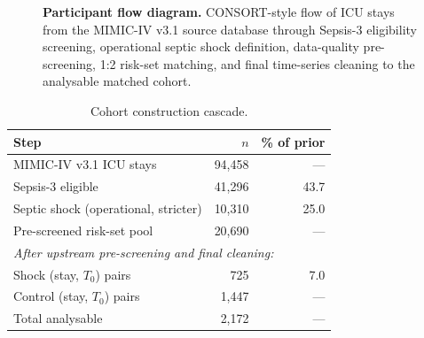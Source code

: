 \documentclass[referee,lineno,pdflatex]{sn-article-template/sn-jnl}
\begin{document}
\begin{figure}[htbp]
  \caption{%
    \textbf{Participant flow diagram.}
    CONSORT-style flow of ICU stays from the MIMIC-IV v3.1 source database through
    Sepsis-3 eligibility screening, operational septic shock definition, data-quality
    pre-screening, 1:2 risk-set matching, and final time-series cleaning to the
    analysable matched cohort.
  }
  \label{fig:consort}
\end{figure}

\begin{table}[ht]
\centering
\caption{Cohort construction cascade.}
\label{tab:cohort}
\begin{tabular}{lrr}
\toprule
Step & $n$ & \% of prior \\
\midrule
MIMIC-IV v3.1 ICU stays & 94,458 & --- \\
Sepsis-3 eligible & 41,296 & 43.7 \\
Septic shock (operational, stricter) & 10,310 & 25.0 \\
Pre-screened risk-set pool & 20,690 & --- \\
\midrule
\multicolumn{3}{l}{\textit{After upstream pre-screening and final cleaning:}} \\
Shock (stay, $T_0$) pairs & 725 & 7.0 \\
Control (stay, $T_0$) pairs & 1,447 & --- \\
Total analysable & 2,172 & --- \\
\bottomrule
\end{tabular}
\end{table}
\end{document}
